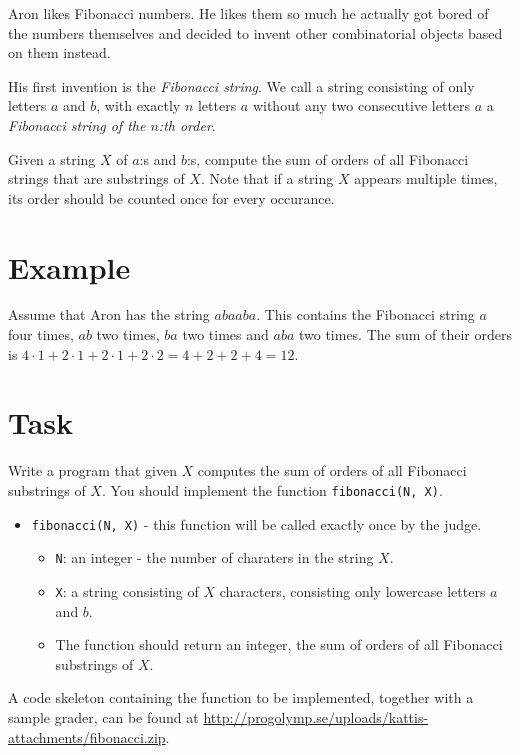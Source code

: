 \newcommand\version{v1}
Aron likes Fibonacci numbers. He likes them so much he actually got bored of the numbers themselves and decided to invent
other combinatorial objects based on them instead.

His first invention is the \emph{Fibonacci string}. We call a string consisting of only letters $a$ and $b$,
with exactly $n$ letters $a$ without any two consecutive letters $a$ a \emph{Fibonacci string of the $n$:th order}.

Given a string $X$ of $a$:s and $b$:s, compute the sum of orders of all Fibonacci strings that are substrings of $X$.
Note that if a string $X$ appears multiple times, its order should be counted once for every occurance.

\section*{Example}
Assume that Aron has the string $abaaba$. This contains the Fibonacci string $a$ four times, $ab$ two times, $ba$ two times and $aba$ two times.
The sum of their orders is $4 \cdot 1 + 2 \cdot 1 + 2 \cdot 1 + 2 \cdot 2 = 4 + 2 + 2 + 4 = 12$.

\section*{Task}
Write a program that given $X$ computes the sum of orders of all Fibonacci substrings of $X$.
You should implement the function \texttt{fibonacci(N, X)}.

\begin{itemize}
  \item \texttt{fibonacci(N, X)} - this function will be called exactly once by the judge.
  \begin{itemize}
    \item \texttt{N}: an integer - the number of charaters in the string $X$.
    \item \texttt{X}: a string consisting of $X$ characters, consisting only lowercase letters $a$ and $b$.
    \item The function should return an integer, the sum of orders of all Fibonacci substrings of $X$.
  \end{itemize}
\end{itemize}

A code skeleton containing the function to be implemented, together with a sample grader, can be found at
\url{http://progolymp.se/uploads/kattis-attachments/fibonacci.zip}.


